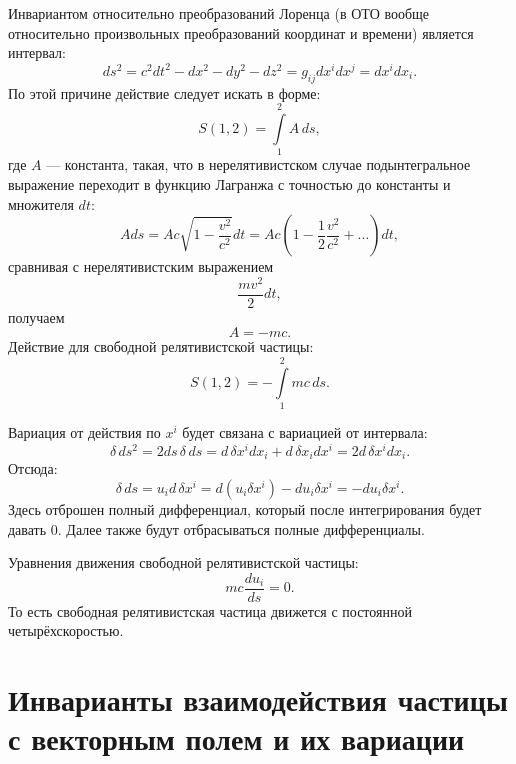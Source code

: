 \documentclass[a4paper,14pt]{extreport} %
\newcommand{\Dff}[2]{\frac{d #1}{d #2}}
\begin{document}
	Инвариантом относительно преобразований Лоренца (в ОТО вообще относительно произвольных преобразований координат и времени) является интервал:
	\begin{equation*}
		ds^2 = c^2 dt^2 - dx^2 - dy^2 - dz^2 = g_{ij} dx^i dx^j = dx^i dx_i.
	\end{equation*}
	По этой причине действие следует искать в форме:
	\begin{equation*}
		S(1, 2) = \int\limits_{1}^{2} A\, ds,
	\end{equation*}
	где $A$ --- константа, такая, что в нерелятивистском случае подынтегральное выражение переходит в функцию Лагранжа с точностью до константы и множителя $dt$:
	\begin{equation*}
		A ds = A c \sqrt{1 - \frac{v^2}{c^2}} dt = A c \left( 1 - \frac{1}{2} \frac{v^2}{c^2} + \ldots \right) dt,
	\end{equation*}
	сравнивая с нерелятивистским выражением
	\begin{equation*}
		\frac{mv^2}{2} dt,
	\end{equation*}
	получаем 
	\begin{equation*}
		A = - mc.
	\end{equation*}
	Действие для свободной релятивистской частицы:
	\begin{equation*}
		S(1, 2) = -\int\limits_{1}^{2} mc\, ds.
	\end{equation*}
	
	Вариация от действия по $x^i$ будет связана с вариацией от интервала:
	\begin{equation*}
		\delta\, ds^2 = 2 ds\, \delta\, ds  = d\, \delta x^i dx_i + d\, \delta x_i dx^i = 2 d\, \delta x^i dx_i.
	\end{equation*}
	Отсюда:
	\begin{equation*}
		\delta\, ds = u_i d\, \delta x^i = d (u_i \delta x^i) - du_i \delta x^i = - du_i \delta x^i.
	\end{equation*}
	Здесь отброшен полный дифференциал, который после интегрирования будет давать 0. Далее также будут отбрасываться полные дифференциалы. 
	
	Уравнения движения свободной релятивистской частицы:
	\begin{equation*}
		mc \Dff{u_i}{s} = 0.
	\end{equation*}
	То есть свободная релятивистская частица движется с постоянной четырёхскоростью.
	
	\section{Инварианты взаимодействия частицы с векторным полем и их вариации}
	
\end{document}
